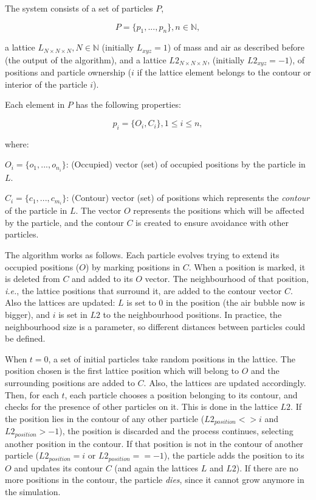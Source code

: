 \documentclass[oneside,a4paper,english,links]{amca}
\begin{document}
The system consists of a set of particles $P$, 

\begin{equation}
  P = \{p_{1}, ... , p_{n}\}, n  \in \mathbb{N},
\end{equation}

a lattice $L_{N\times N \times N}, N \in \mathbb{N} $ (initially $L_{xyz}=1$) of mass and air as described before (the output of the algorithm), and a lattice $L2_{N\times N \times N}$, (initially $L2_{xyz}=-1$), of positions and particle ownership ($i$ if the lattice element belongs to the contour or interior of the particle $i$).

Each element in $P$ has the following properties:

\begin{equation}
  p_{i} = \{O_{i}, C_{i}\}, 1 \le i \le n,
\end{equation}

where:

$O_{i} = \{o_{1}, ... , o_{n_{i}}\}$: (Occupied) vector (set) of occupied positions by the particle in $L$.

$C_{i} = \{c_{1}, ... , c_{m_{i}}\}$: (Contour) vector (set) of positions which represents the {\em contour} of the particle in $L$. The vector $O$ represents the positions which will be affected by the particle, and the contour $C$ is created to ensure avoidance with other particles.

The algorithm works as follows. Each particle evolves trying to extend its occupied positions ($O$) by marking positions in $C$. When a position is marked, it is deleted from $C$ and added to its $O$ vector. The neighbourhood of that position, {\em i.e.}, the lattice positions that surround it, are added to the contour vector $C$. Also the lattices are updated: $L$ is set to $0$ in the position (the air bubble now is bigger), and $i$ is set in $L2$ to the neighbourhood positions. In practice, the neighbourhood size is a parameter, so different distances between particles could be defined.

When $t = 0$, a set of initial particles take random positions in the lattice. The position chosen is the first lattice position which will belong to $O$ and the surrounding positions are added to $C$. Also, the lattices are updated accordingly. Then, for each $t$, each particle chooses a position belonging to its contour, and checks for the presence of other particles on it. This is done in the lattice $L2$. If the position lies in the contour of any other particle ($L2_{position} <> i$ and $L2_{position} > -1$), the position is discarded and the process continues, selecting another position in the contour. If that position is not in the contour of another particle ($L2_{position} = i$ or $L2_{position} == -1$), the particle adds the position to its $O$ and updates its contour $C$ (and again the lattices $L$ and $L2$). If there are no more positions in the contour, the particle {\em dies}, since it cannot grow anymore in the simulation.
\end{document}
